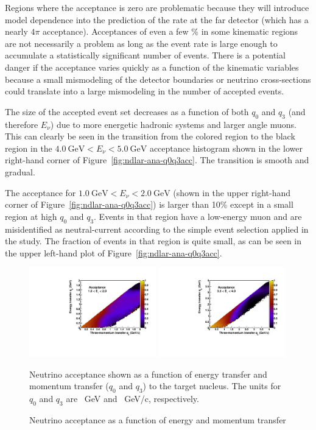 Regions where the acceptance is zero are problematic because they will introduce model dependence into the prediction of the rate at the far detector (which has a nearly $4\pi$ acceptance). 
Acceptances of even a few \% in some kinematic regions are not necessarily a problem as long as the event rate is large enough to accumulate a statistically significant number of events.
There is a potential danger if the acceptance varies quickly as a function of the kinematic variables because a small mismodeling of the detector boundaries or neutrino cross-sections could translate into a large mismodeling in the number of accepted events. 

The size of the accepted event set decreases as a function of both $q_0$ and $q_3$ (and therefore $E_\nu$) due to more energetic hadronic systems and larger angle muons. 
This can clearly be seen in the transition from the colored region to the black region in the $\SI{4.0}{\giga\electronvolt} < E_\nu < \SI{5.0}{\giga\electronvolt}$ acceptance histogram shown in the lower right-hand corner of Figure~\ref{fig:ndlar-ana-q0q3acc}. The transition is smooth and gradual.

The acceptance for $\SI{1.0}{\giga\electronvolt} < E_\nu < \SI{2.0}{\giga\electronvolt}$ (shown in the upper right-hand corner of Figure~\ref{fig:ndlar-ana-q0q3acc}) is larger than 10\% except in a small region at high $q_0$ and $q_3$. 
Events in that region have a low-energy muon and are misidentified as neutral-current according to the simple event selection applied in the study. 
The fraction of events in that region is quite small, as can be seen in the upper left-hand plot of Figure~\ref{fig:ndlar-ana-q0q3acc}. 

\begin{figure}
\centering
\includegraphics[width=0.49\textwidth]{graphics/lartpc/eff_q0q3_Ev_1000_2000.pdf}
\includegraphics[width=0.49\textwidth]{graphics/lartpc/eff_q0q3_Ev_3500_4000.pdf}
\caption{Neutrino acceptance as a function of energy and momentum transfer}
{Neutrino acceptance shown as a function of energy transfer and momentum transfer ($q_0$ and $q_3$) to the target nucleus. The units for $q_0$ and $q_3$ are \SI{}{\giga\electronvolt} and \SI{}{\giga\electronvolt}/c, respectively.}
\label{fig:q0q3acc}
\end{figure}

